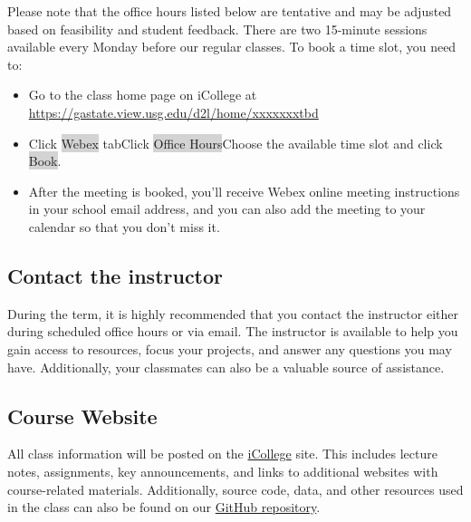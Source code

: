 \documentclass[a4paper, 12pt]{article}
\begin{document}
\begin{flushleft}
Please note that the office hours listed below are tentative and may be adjusted based on feasibility and student feedback. There are two 15-minute sessions available every Monday before our regular classes. To book a time slot, you need to:
  \begin{itemize}
    \item Go to the class home page on iCollege at \url{https://gastate.view.usg.edu/d2l/home/xxxxxxxtbd}
    \item Click \colorbox{lightgray}{Webex} tab\textrightarrow Click \colorbox{lightgray}{Office Hours}\textrightarrow Choose the available time slot and click \colorbox{lightgray}{Book}.
    \item After the meeting is booked, you'll receive Webex online meeting instructions in your school email address, and you can also add the meeting to your calendar so that you don't miss it.
  \end{itemize}
\end{flushleft}

\subsection{Contact the instructor}
During the term, it is highly recommended that you contact the instructor either during scheduled office hours or via email. The instructor is available to help you gain access to resources, focus your projects, and answer any questions you may have. Additionally, your classmates can also be a valuable source of assistance.

\subsection{Course Website}
All class information will be posted on the \href{https://icollege.gsu.edu/}{iCollege} site. This includes lecture notes, assignments, key announcements, and links to additional websites with course-related materials. Additionally, source code, data, and other resources used in the class can also be found on our \href{https://github.com/xiangshiyin/machine-learning-for-actuarial-science}{GitHub repository}.
\end{document}
